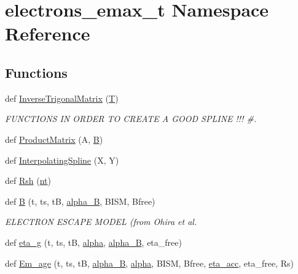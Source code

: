 \hypertarget{namespaceelectrons__emax__t}{}\section{electrons\+\_\+emax\+\_\+t Namespace Reference}
\label{namespaceelectrons__emax__t}
\subsection*{Functions}
\begin{DoxyCompactItemize}
\item 
def \hyperlink{namespaceelectrons__emax__t_a140855cc82b63d8302365a419a1add08}{Inverse\+Trigonal\+Matrix} (\hyperlink{cr__source_8h_ac94a6e5794c2d7b59588b14025cfba20}{T})
\begin{DoxyCompactList}\small\item\em F\+U\+N\+C\+T\+I\+O\+NS IN O\+R\+D\+ER TO C\+R\+E\+A\+TE A G\+O\+OD S\+P\+L\+I\+NE !!! \#. \end{DoxyCompactList}\item 
def \hyperlink{namespaceelectrons__emax__t_ac8b6bf2c54cd2fa44772068fd088b8a8}{Product\+Matrix} (A, \hyperlink{namespaceelectrons__emax__t_af60aa37c8e6a03f723b8224a73aec7df}{B})
\item 
def \hyperlink{namespaceelectrons__emax__t_afc42553e27c82768ae0416dd27a29ef5}{Interpolating\+Spline} (X, Y)
\item 
def \hyperlink{namespaceelectrons__emax__t_a41e3a35a8fef828b7e38f7b2cedd9ab6}{Rsh} (\hyperlink{namespaceelectrons__emax__t_af39d537cdc6ea46e3e9f97d4d3f61a07}{nt})
\item 
def \hyperlink{namespaceelectrons__emax__t_af60aa37c8e6a03f723b8224a73aec7df}{B} (t, ts, tB, \hyperlink{namespaceelectrons__emax__t_a80e5be66eafafacb2d2f62f7dbfaf8d5}{alpha\+\_\+B}, B\+I\+SM, Bfree)
\begin{DoxyCompactList}\small\item\em E\+L\+E\+C\+T\+R\+ON E\+S\+C\+A\+PE M\+O\+D\+EL (from Ohira et al. \end{DoxyCompactList}\item 
def \hyperlink{namespaceelectrons__emax__t_a2c280c70157668aa5f5d48ec1ecc9316}{eta\+\_\+g} (t, ts, tB, \hyperlink{namespaceelectrons__emax__t_a2ca4cffb383bb74bb2caacc4e62728b4}{alpha}, \hyperlink{namespaceelectrons__emax__t_a80e5be66eafafacb2d2f62f7dbfaf8d5}{alpha\+\_\+B}, eta\+\_\+free)
\item 
def \hyperlink{namespaceelectrons__emax__t_a57263803b81ea855037f97b438ad414c}{Em\+\_\+age} (t, ts, tB, \hyperlink{namespaceelectrons__emax__t_a80e5be66eafafacb2d2f62f7dbfaf8d5}{alpha\+\_\+B}, \hyperlink{namespaceelectrons__emax__t_a2ca4cffb383bb74bb2caacc4e62728b4}{alpha}, B\+I\+SM, Bfree, \hyperlink{constants_8h_a7dd0fdc6bda4f1811187b7e6f8e73812}{eta\+\_\+acc}, eta\+\_\+free, Rs)

\end{DoxyCompactItemize}
